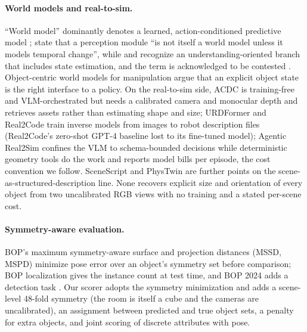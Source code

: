 \documentclass[10pt,a4paper]{article}
\begin{document}
\paragraph{World models and real-to-sim.}
``World model'' dominantly denotes a learned, action-conditioned predictive model \citep{ha2018world,hafner2019dream,hafner2023mastering,assran2025v,nvidia2025cosmos}; \citet{wang2026world} state that a perception module ``is not itself a world model unless it models temporal change'', while \citet{ding2024understanding} and \citet{chen2026definition} recognize an understanding-oriented branch that includes state estimation, and the term is acknowledged to be contested \citep{kong20253d}. Object-centric world models for manipulation \citep{ferraro2023focus,chen2025goal} argue that an explicit object state is the right interface to a policy. On the real-to-sim side, ACDC \citep{dai2024automated} is training-free and VLM-orchestrated but needs a calibrated camera and monocular depth and retrieves assets rather than estimating shape and size; URDFormer \citep{chen2024urdformer} and Real2Code \citep{mandi2024real2code} train inverse models from images to robot description files (Real2Code's zero-shot GPT-4 baseline lost to its fine-tuned model); Agentic Real2Sim \citep{chen2026agentic} confines the VLM to schema-bounded decisions while deterministic geometry tools do the work and reports model bills per episode, the cost convention we follow. SceneScript \citep{avetisyan2024scenescript} and PhysTwin \citep{jiang2025phystwin} are further points on the scene-as-structured-description line. None recovers explicit size and orientation of every object from two uncalibrated RGB views with no training and a stated per-scene cost.

\paragraph{Symmetry-aware evaluation.}
BOP's maximum symmetry-aware surface and projection distances (MSSD, MSPD) \citep{hodan2018bop,hodan2020bop} minimize pose error over an object's symmetry set before comparison; BOP localization gives the instance count at test time, and BOP 2024 adds a detection task \citep{nguyen2025bop}. Our scorer adopts the symmetry minimization and adds a scene-level 48-fold symmetry (the room is itself a cube and the cameras are uncalibrated), an assignment between predicted and true object sets, a penalty for extra objects, and joint scoring of discrete attributes with pose.
\end{document}
